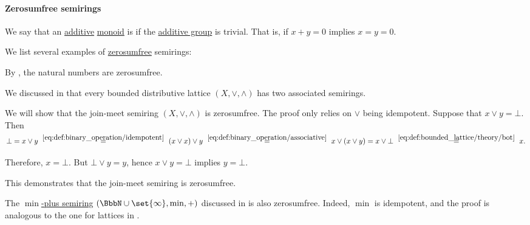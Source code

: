 \paragraph{Zerosumfree semirings}

\begin{definition}\label{def:zerosumfree}
  We say that an \hyperref[con:additive_semigroup]{additive} \hyperref[def:monoid]{monoid} is  if the \hyperref[thm:invertible_submonoid_is_group]{additive group} is trivial. That is, if \( x + y = 0 \) implies \( x = y = 0 \).
\end{definition}

\begin{example}\label{ex:def:zerosumfree}
  We list several examples of \hyperref[def:zerosumfree]{zerosumfree} semirings:
  \begin{thmenum}
     By , the natural numbers are zerosumfree.

     We discussed in  that every bounded distributive lattice \( (X, \vee, \wedge) \) has two associated semirings.

    We will show that the join-meet semiring \( (X, \vee, \wedge) \) is zerosumfree. The proof only relies on \( \vee \) being idempotent. Suppose that \( x \vee y = \bot \). Then
    \begin{equation*}
      \bot
      =
      x \vee y
      \reloset {\eqref{eq:def:binary_operation/idempotent}} =
      (x \vee x) \vee y
      \reloset {\eqref{eq:def:binary_operation/associative}} =
      x \vee (x \vee y)
      =
      x \vee \bot
      \reloset {\eqref{eq:def:bounded_lattice/theory/bot}} =
      x.
    \end{equation*}

    Therefore, \( x = \bot \). But \( \bot \vee y = y \), hence \( x \vee y = \bot \) implies \( y = \bot \).

    This demonstrates that the join-meet semiring is zerosumfree.

     The \hyperref[def:tropical_semiring]{\( \min \)-plus semiring} \( (\BbbN \cup \set{ \infty }, \min, +) \) discussed in  is also zerosumfree. Indeed, \( \min \) is idempotent, and the proof is analogous to the one for lattices in .
  \end{thmenum}
\end{example}
